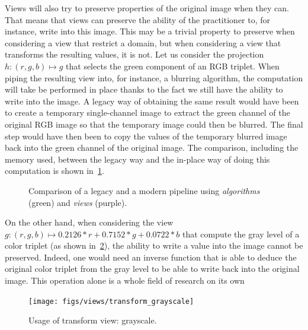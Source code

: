 Views will also try to preserve properties of the original image when they can. That means that views can preserve the
ability of the practitioner to, for instance, write into this image. This may be a trivial property to preserve when
considering a view that restrict a domain, but when considering a view that transforms the resulting values, it is not.
Let us consider the projection $h: (r,g,b) \mapsto g$ that selects the green component of an RGB triplet. When piping
the resulting view into, for instance, a blurring algorithm, the computation will take be performed in place thanks to
the fact we still have the ability to write into the image. A legacy way of obtaining the same result would have been to
create a temporary single-channel image to extract the green channel of the original RGB image so that the temporary
image could then be blurred. The final step would have then been to copy the values of the temporary blurred image back
into the green channel of the original image. The comparison, including the memory used, between the legacy way and the
in-place way of doing this computation is shown in~\cref{fig.legacy.vs.view}.

\begin{figure}[htbp]
  \centering
  \hfil

  \caption{Comparison of a legacy and a modern pipeline using \emph{algorithms} (green) and \emph{views} (purple).}
  \label{fig.legacy.vs.view}
\end{figure}

On the other hand, when considering the view $g: (r,g,b) \mapsto 0.2126*r+0.7152*g+0.0722*b$ that compute the gray level
of a color triplet (as shown in~\cref{fig.view.grayscale}), the ability to write a value into the image cannot be
preserved. Indeed, one would need an inverse function that is able to deduce the original color triplet from the gray
level to be able to write back into the original image. This operation alone is a whole field of research on its
own~\parencite{zhang.2016.colorful,levin.2004.colorization,welsh.2002.transferring}

\begin{figure}[htbp]
  \centering
  \texttt{[image: figs/views/transform\_grayscale]}
  \caption{Usage of transform view: grayscale.}
  \label{fig.view.grayscale}
\end{figure}

